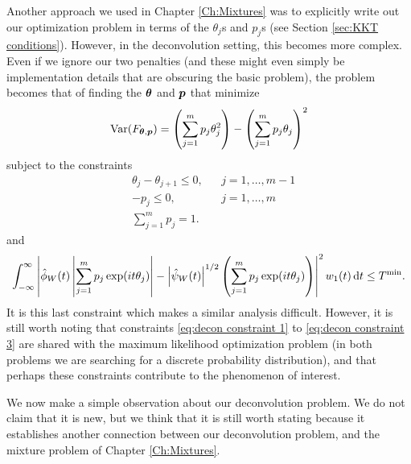 Another approach we used in Chapter \ref{Ch:Mixtures} was to explicitly write out our optimization problem in terms of the $\theta_j$s and $p_j$s (see Section \ref{sec:KKT conditions}). However, in the deconvolution setting, this becomes more complex. Even if we ignore our two penalties (and these might even simply be implementation details that are obscuring the basic problem), the problem becomes that of finding the ${\bm{{\theta}}}$ and ${\bm{{p}}}$ that minimize
\begin{equation}
	\mathrm{Var}(F_{{\bm{{\theta}}}, {\bm{{p}}}}) = \left(\sum_{j =1}^m p_j \theta_j^2 \right) - \left(\sum_{j = 1}^m p_j \theta_j \right)^2
\end{equation}
subject to the constraints
\begin{align}
	&\theta_j -\theta_{j+1} \leq 0, &&j=1,\dots,m-1	\label{eq:decon constraint 1}\\
	&-p_j \leq 0, &&j=1,\dots,m	\label{eq:decon constraint 2} \\
	&\sum_{j=1}^m p_j = 1.
	\label{eq:decon constraint 3}
\end{align}
and
\begin{equation}
	\int_{-\infty}^\infty \left| \hat{\phi}_W(t) \left|\sum_{j = 1}^m p_j \exp(it\theta_j)\right| - \left|\hat{\psi}_W(t)\right|^{1/2} \left(\sum_{j = 1}^m p_j \exp(it\theta_j) \right)\right|^2 w_1(t) \, \mathrm{d} t \leq T^\mathrm{min}.
\end{equation}
It is this last constraint which makes a similar analysis difficult. However, it is still worth noting that constraints \eqref{eq:decon constraint 1} to \eqref{eq:decon constraint 3} are shared with the maximum likelihood optimization problem (in both problems we are searching for a discrete probability distribution), and that perhaps these constraints contribute to the phenomenon of interest.



We now make a simple observation about our deconvolution problem. We do not claim that it is new, but we think that it is still worth stating because it establishes another connection between our deconvolution problem, and the mixture problem of Chapter \ref{Ch:Mixtures}.

